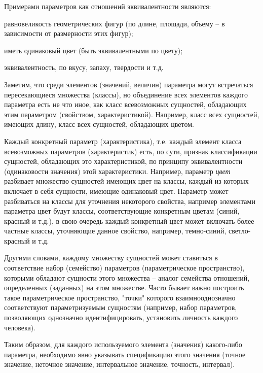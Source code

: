 Примерами параметров как отношений эквивалентности являются:

\begin{textitemize}
		\item равновеликость геометрических фигур (по длине, площади, объему -- в зависимости от размерности этих фигур);
		\item иметь одинаковый цвет (быть эквивалентными по цвету);
		\item эквивалентность, по вкусу, запаху, твердости и т.д.
\end{textitemize}
		
Заметим, что среди элементов (значений, величин) параметра могут встречаться пересекающиеся множества (классы), но объединение всех элементов каждого параметра есть не что иное, как класс всевозможных сущностей, обладающих этим параметром (свойством, характеристикой). Например, класс всех сущностей, имеющих длину, класс всех сущностей, обладающих цветом.
		
Каждый конкретный параметр (характеристика), т.е. каждый элемент класса всевозможных параметров (характеристик) есть, по сути, признак классификации сущностей, обладающих это характеристикой, по принципу эквивалентности (одинаковости значения) этой характеристики. Например, параметр \textit{цвет} разбивает множество сущностей имеющих цвет на классы, каждый из которых включает в себя сущности, имеющие одинаковый цвет. Параметр может разбиваться на классы для уточнения некоторого свойства, например элементами параметра цвет будут классы, соответствующие конкретным цветам (синий, красный и т.д.), в свою очередь каждый конкретный цвет может включать более частные классы, уточняющие данное свойство, например, темно-синий, светло-красный и т.д.
		
Другими словами, каждому множеству сущностей может ставиться в соответствие набор (семейство) параметров (параметрическое пространство), которыми обладают сущности этого множества -- аналог семейства отношений, определенных (заданных) на этом множестве. Часто бывает важно построить такое параметрическое пространство, "точки"{} которого взаимнооднозначно соответствуют параметризуемым сущностям (например, набор параметров, позволяющих однозначно идентифицировать, установить личность каждого человека). 
		
Таким образом, для каждого используемого элемента (значения) какого-либо параметра, необходимо явно указывать спецификацию этого значения (точное значение, неточное значение, интервальное значение, точность, интервал).
		
